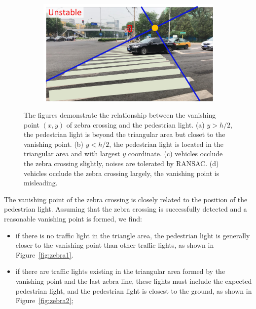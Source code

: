 \begin{figure}[ht!]
\begin{center}
\begin{subfigure}[h]{0.48\linewidth}
  \caption{}
  \label{fig:zebra3}
  \end{subfigure}
  \begin{subfigure}[h]{0.48\linewidth}
  \includegraphics[width=1.\linewidth]{figure/zebra4.jpg}
  \caption{}
  \label{fig:zebra4}
  \end{subfigure}
\end{center}
   \caption{The figures demonstrate the relationship between the vanishing point $(x, y)$ of zebra crossing and the pedestrian light. (a) $y > h/2$, the pedestrian light is beyond the triangular area but closet to the vanishing point. (b) $y < h/2$, the pedestrian light is located in the triangular area and with largest $y$ coordinate. (c) vehicles occlude the zebra crossing slightly, noises are tolerated by RANSAC. (d) vehicles occlude the zebra crossing largely, the vanishing point is misleading.}
\label{fig:zebra}
\end{figure}



 The vanishing point of the zebra crossing is closely related to the position of the pedestrian light. Assuming that the zebra crossing is successfully detected and a reasonable vanishing point is formed, we find: 
\begin{itemize}
\item if there is no traffic light in the triangle area, the pedestrian light is generally closer to the vanishing point than other traffic lights, as shown in Figure~\ref{fig:zebra1}.
\item if there are traffic lights existing in the triangular area formed by the vanishing point and the last zebra line, these lights must include the expected pedestrian light, and the pedestrian light is closest to the ground, as shown in Figure~\ref{fig:zebra2}; 
\end{itemize}

